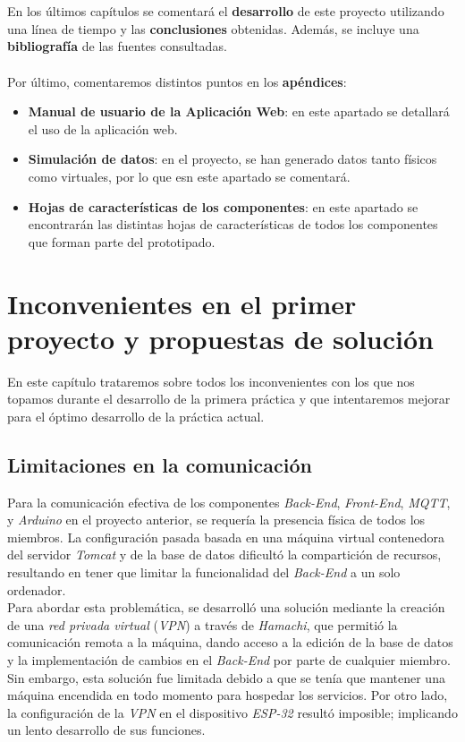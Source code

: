 \documentclass[12pt]{report}
\begin{document}
\\\\
En los últimos capítulos se comentará el \textbf{desarrollo} de este proyecto utilizando una línea de tiempo y las \textbf{conclusiones} obtenidas. Además, se incluye una \textbf{bibliografía} de las fuentes consultadas.
\\\\
Por último, comentaremos distintos puntos en los \textbf{apéndices}:
\begin{itemize}
    \item \textbf{Manual de usuario de la Aplicación Web}: en este apartado se detallará el uso de la aplicación web.
    \item \textbf{Simulación de datos}: en el proyecto, se han generado datos tanto físicos como virtuales, por lo que esn este apartado se comentará.
    \item \textbf{Hojas de características de los componentes}: en este apartado se encontrarán las distintas hojas de características de todos los componentes que forman parte del prototipado.
\end{itemize}

\chapter{Inconvenientes en el primer proyecto y propuestas de solución}
En este capítulo trataremos sobre todos los inconvenientes con los que nos topamos durante el desarrollo de la primera práctica y que intentaremos mejorar para el óptimo desarrollo de la práctica actual.
\section{Limitaciones en la comunicación}
Para la comunicación efectiva de los componentes \textit{Back-End}, \textit{Front-End}, \textit{MQTT}, y \textit{Arduino} en el proyecto anterior, se requería la presencia física de todos los miembros. La configuración pasada basada en una máquina virtual contenedora del servidor \textit{Tomcat} y de la base de datos dificultó la compartición de recursos, resultando en tener que limitar la funcionalidad del \textit{Back-End} a un solo ordenador.\\
Para abordar esta problemática, se desarrolló una solución mediante la creación de una \textit{red privada virtual} (\textit{VPN}) a través de \textit{Hamachi}, que permitió la comunicación remota a la máquina, dando acceso a la edición de la base de datos y la implementación de cambios en el \textit{Back-End} por parte de cualquier miembro. Sin embargo, esta solución fue limitada debido a que se tenía que mantener una máquina encendida en todo momento para hospedar los servicios. Por otro lado, la configuración de la \textit{VPN} en el dispositivo \textit{ESP-32} resultó imposible; implicando un lento desarrollo de sus funciones.
\end{document}
